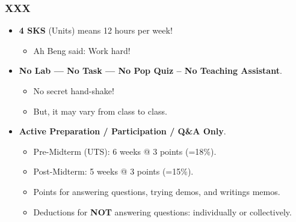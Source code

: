 \documentclass[xcolor=table, notheorems, hyperref={pdfpagelabels=false}]{beamer}
\begin{document}
\begin{frame}[fragile]
\frametitle{XXX}

\begin{itemize}
\item \textbf{4 SKS} (Units) means 12 hours per week!
\begin{itemize}
\item Ah Beng said: Work hard!
\end{itemize}
\item \textbf{No Lab --- No Task --- No Pop Quiz -- No Teaching Assistant}\footnotemark[\value{footnote}].
\begin{itemize}
\item No secret hand-shake!
\item But, it may vary from class to class.
\end{itemize}
\item \textbf{Active Preparation / Participation / Q\&A Only}.
\begin{itemize}
\item Pre-Midterm (UTS): 6 weeks @ 3 points (=18\%).
\item Post-Midterm: 5 weeks @ 3 points (=15\%).
\item Points for answering questions, trying demos, and writings memos.
\item Deductions for \textbf{NOT} answering questions: individually or collectively.
\end{itemize}
\end{itemize}

\end{frame}
\end{document}
